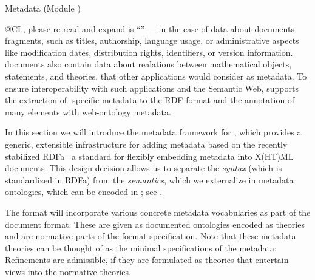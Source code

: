 
\begin{module}[id=genmeta]
\begin{omgroup}[creators={miko,clange},short={Metadata},id=metadatachap]
  {Metadata (Module {})}

\begin{newpart}{@CL, please re-read and expand}
   is ``{}'' --- in the case of
  {\omdoc} data about documents fragments, such as titles, authorship, language usage, or
  administrative aspects like modification dates, distribution rights, identifiers, or
  version information. {\omdoc} documents also contain data about realations between
  mathematical objects, statements, and theories, that other applications would consider
  as metadata. To ensure interoperability with such applications and the Semantic Web,
  {\omdoc} supports the extraction of {\omdoc}-specific metadata to the RDF
  format and the annotation of many {\omdoc} elements with web-ontology
  metadata.

  In this section we will introduce the metadata framework for {},
  which provides a generic, extensible infrastructure for adding metadata based on the
  recently stabilized RDFa~\cite{AdidaEtAl08:RDFa} a standard for flexibly embedding
  metadata into X(HT)ML documents. This design decision allows us to separate the
  {\emph{syntax}} (which is standardized in RDFa) from the {\emph{semantics}}, which we
  externalize in metadata ontologies, which can be encoded in {\omdoc}; see
  {}.



\begin{omtext}
  The {\omdoc} format will incorporate various concrete metadata vocabularies as part of
  the document format. These are given as documented ontologies encoded as {\omdoc}
  theories and are normative parts of the format specification. Note that these metadata
  theories can be
  thought of as the minimal specifications of the metadata: Refinements are admissible, if
  they are formulated as {\omdoc} theories that entertain views into the normative
  theories.
\end{omtext}


\end{newpart}
\end{omgroup}
\end{module}
